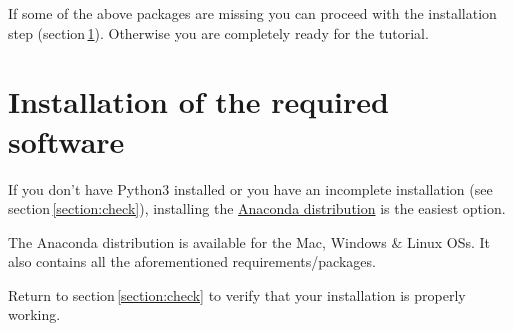 \documentclass[11pt]{article}
\begin{document}
If some of the above packages are missing you can proceed with 
the installation step (section\,\ref{section:install}). Otherwise 
you are completely ready for the tutorial.
 
\section{Installation of the required software}\label{section:install}
If you don't have Python$3$ installed or you have an incomplete installation 
(see section\,\ref{section:check}),
installing the \href{https://www.anaconda.com/download/}{Anaconda distribution} is 
the easiest option.

The Anaconda distribution is available for the Mac, Windows \& Linux OSs. 
It also contains all the aforementioned requirements/packages.

Return to section\,\ref{section:check} to verify that your installation is properly working.

%
%
\end{document}
